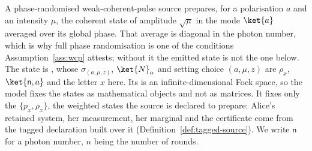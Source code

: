 
A phase-randomised weak-coherent-pulse source prepares, for a polarisation $a$
and an intensity $\mu$, the coherent state of amplitude $\sqrt{\mu}$ in the
mode $\ket{a}$ averaged over its global phase. That average is diagonal in the
photon number, which is why full phase randomisation is one of the conditions
Assumption~\ref{ass:wcp} attests; without it the emitted state is not the one
below. The state is \cite[Eq.~(144)]{tupkary2026decoy}, whose
$\sigma_{(a,\mu,z)}$, $\ket{N}_a$ and setting choice $(a,\mu,z)$ are $\rho_x$,
$\ket{\mathsf{n},a}$ and the letter $x$ here. Its  is
an infinite-dimensional Fock space, so the model fixes the states as
mathematical objects and not as matrices. It fixes only the
 $\{p_x,\rho_x\}$, the
weighted states the source is declared to prepare:
Alice's retained system, her measurement, her marginal and the certificate come
from the tagged declaration built over it (Definition~\ref{def:tagged-source}).
We write $\mathsf{n}$ for a photon number, $n$ being the number of rounds.

